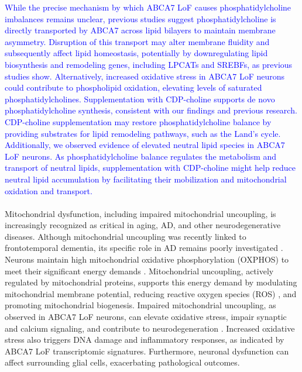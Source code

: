 \newcommand{\quoteI}{\textcolor{blue}{While the precise mechanism by which ABCA7 LoF causes phosphatidylcholine imbalances remains unclear, previous studies suggest phosphatidylcholine is directly transported by ABCA7 across lipid bilayers to maintain membrane asymmetry. Disruption of this transport may alter membrane fluidity and subsequently affect lipid homeostasis, potentially by downregulating lipid biosynthesis and remodeling genes, including LPCATs and SREBFs, as previous studies show. Alternatively, increased oxidative stress in ABCA7 LoF neurons could contribute to phospholipid oxidation, elevating levels of saturated phosphatidylcholines. Supplementation with CDP-choline supports de novo phosphatidylcholine synthesis, consistent with our findings and previous research. CDP-choline supplementation may restore phosphatidylcholine balance by providing substrates for lipid remodeling pathways, such as the Land’s cycle. Additionally, we observed evidence of elevated neutral lipid species in ABCA7 LoF neurons. As phosphatidylcholine balance regulates the metabolism and transport of neutral lipids, supplementation with CDP-choline might help reduce neutral lipid accumulation by facilitating their mobilization and mitochondrial oxidation and transport.\label{quoteI-label}}} 
\quoteI\\\\
Mitochondrial dysfunction, including impaired mitochondrial uncoupling, is increasingly recognized as critical in aging, AD, and other neurodegenerative diseases. Although mitochondrial uncoupling was recently linked to frontotemporal dementia, its specific role in AD remains poorly investigated \cite{noauthor_2022-os,Bano2023-qz,Zong2024-tn,Demine2019-qj,noauthor_2013-rt,Picca2023-gt}. Neurons maintain high mitochondrial oxidative phosphorylation (OXPHOS) to meet their significant energy demands \cite{Morant-Ferrando2023-va,Trigo2022-ym}. Mitochondrial uncoupling, actively regulated by mitochondrial proteins\cite{Park2023-fa,noauthor_2016-fg}, supports this energy demand by modulating mitochondrial membrane potential, reducing reactive oxygen species (ROS) \cite{Demine2019-qj,Shadel2015-kt}, and promoting mitochondrial biogenesis\cite{Korshunov1997-aj,Wisloff2005-ho,Andrews2005-yy,noauthor_2022-vx}. Impaired mitochondrial uncoupling, as observed in ABCA7 LoF neurons, can elevate oxidative stress, impair synaptic and calcium signaling, and contribute to neurodegeneration \cite{Korshunov1997-aj,Wisloff2005-ho,Andrews2005-yy,noauthor_2022-vx}. Increased oxidative stress also triggers DNA damage and inflammatory responses, as indicated by ABCA7 LoF transcriptomic signatures\cite{Robert2020-sc,Volanti2002-mc,Canty1999-oj,Schreck1992-zr}. Furthermore, neuronal dysfunction can affect surrounding glial cells, exacerbating pathological outcomes\cite{Byrns2024-id,Welch2022-ef}.

